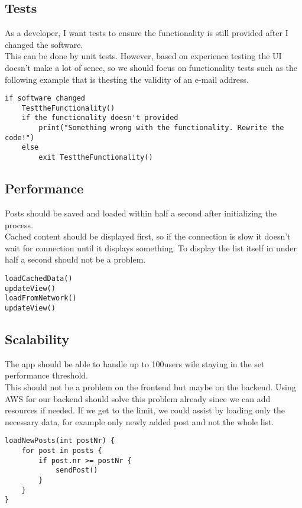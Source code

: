 \documentclass[conference]{IEEEtran}
\numberwithin{figure}{subsection}
\begin{document}
\subsection{Tests}
As a developer, I want tests to ensure the functionality is still provided after I changed the software.\\

This can be done by unit tests. However, based on experience testing the UI doesn't make a lot of sence, so we should focus on functionality tests such as the following example that is thesting the validity of an e-mail address.

\begin{lstlisting}
if software changed
	TesttheFunctionality()
	if the functionality doesn't provided
		print("Something wrong with the functionality. Rewrite the code!")
	else
		exit TesttheFunctionality()
\end{lstlisting}



\subsection{Performance}
Posts  should  be  saved  and  loaded  within half a second after initializing the process.\\

Cached content should be displayed first, so if the connection is slow it doesn't wait for connection until it displays something. To display the list itself in under half a second should not be a problem.

\begin{lstlisting}
loadCachedData()
updateView()
loadFromNetwork()
updateView()
\end{lstlisting}


\subsection{Scalability}
The app should be able to handle up to 100users wile staying in the set performance threshold.\\

This should not be a problem on the frontend but maybe on the backend. Using AWS for our backend should solve this problem already since we can add resources if needed. If we get to the limit, we could assist by loading only the necessary data, for example only newly added post and not the whole list.

\begin{lstlisting}
loadNewPosts(int postNr) {
    for post in posts {
        if post.nr >= postNr {
            sendPost()
        }
    }
}
\end{lstlisting}
\end{document}
